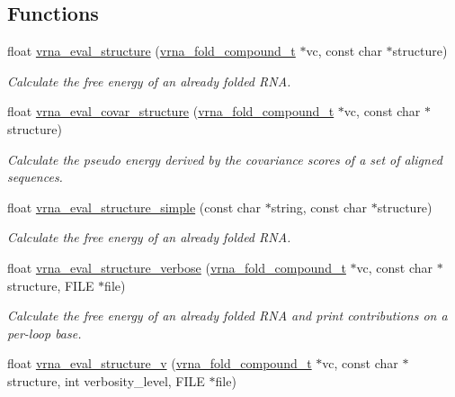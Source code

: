 \subsection*{Functions}
\begin{DoxyCompactItemize}
\item 
float \hyperlink{group__eval_ga58f199f1438d794a265f3b27fc8ea631}{vrna\+\_\+eval\+\_\+structure} (\hyperlink{group__fold__compound_ga1b0cef17fd40466cef5968eaeeff6166}{vrna\+\_\+fold\+\_\+compound\+\_\+t} $\ast$vc, const char $\ast$structure)
\begin{DoxyCompactList}\small\item\em Calculate the free energy of an already folded R\+NA. \end{DoxyCompactList}\item 
float \hyperlink{group__eval_ga6cea75c0eb9857fb59172be54cab09e0}{vrna\+\_\+eval\+\_\+covar\+\_\+structure} (\hyperlink{group__fold__compound_ga1b0cef17fd40466cef5968eaeeff6166}{vrna\+\_\+fold\+\_\+compound\+\_\+t} $\ast$vc, const char $\ast$structure)
\begin{DoxyCompactList}\small\item\em Calculate the pseudo energy derived by the covariance scores of a set of aligned sequences. \end{DoxyCompactList}\item 
float \hyperlink{group__eval_gab6930f446d04761454d033680fbf7909}{vrna\+\_\+eval\+\_\+structure\+\_\+simple} (const char $\ast$string, const char $\ast$structure)
\begin{DoxyCompactList}\small\item\em Calculate the free energy of an already folded R\+NA. \end{DoxyCompactList}\item 
float \hyperlink{group__eval_ga0928d699d310178f84ee2351034e5cb5}{vrna\+\_\+eval\+\_\+structure\+\_\+verbose} (\hyperlink{group__fold__compound_ga1b0cef17fd40466cef5968eaeeff6166}{vrna\+\_\+fold\+\_\+compound\+\_\+t} $\ast$vc, const char $\ast$structure, F\+I\+LE $\ast$file)
\begin{DoxyCompactList}\small\item\em Calculate the free energy of an already folded R\+NA and print contributions on a per-\/loop base. \end{DoxyCompactList}\item 
float \hyperlink{group__eval_gab12e6b1226227670322150df018734f8}{vrna\+\_\+eval\+\_\+structure\+\_\+v} (\hyperlink{group__fold__compound_ga1b0cef17fd40466cef5968eaeeff6166}{vrna\+\_\+fold\+\_\+compound\+\_\+t} $\ast$vc, const char $\ast$structure, int verbosity\+\_\+level, F\+I\+LE $\ast$file)

\end{DoxyCompactItemize}
